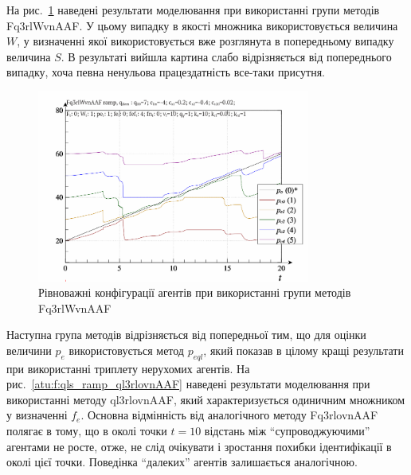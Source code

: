На рис.~\ref{atu:f:qls_ramp_Fq3rlWvnAAF} наведені результати моделювання при
використанні групи методів Fq3rlWvnAAF. У цьому випадку в якості множника
використовується величина
$W$, у визначенні якої використовується вже розглянута в
попередньому випадку величина
$S$. В результаті вийшла картина слабо відрізняється від
попереднього випадку, хоча певна ненульова працездатність
все-таки присутня.

\begin{figure}[htb!]
  \begin{center}
    \includegraphics[width=0.8\textwidth]{p/ramp/qls-p_t_pi_Fq3rlWvnAAF_ramp.png}
  \end{center}
  \caption{Рівноважні конфігурації агентів при використанні групи методів Fq3rlWvnAAF}
  \label{atu:f:qls_ramp_Fq3rlWvnAAF}
\end{figure}

Наступна група методів відрізняється від попередньої тим, що
для оцінки величини
$p_e$ використовується метод
$p_{eql} $, який показав в цілому кращі результати при використанні
триплету нерухомих агентів. На рис.~\ref{atu:f:qls_ramp_ql3rlovnAAF} наведені
результати моделювання при використанні методу ql3rlovnAAF, який
характеризується одиничним множником у визначенні
$f_e$. Основна відмінність від аналогічного методу Fq3rlovnAAF полягає
в тому, що в околі точки
$ t = 10 $ відстань між ``супроводжуючими'' агентами не росте, отже, не
слід очікувати і зростання похибки ідентифікації в околі цієї
точки. Поведінка ``далеких'' агентів залишається аналогічною.


